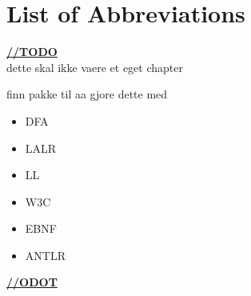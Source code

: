 \chapter{List of Abbreviations}


\underline{\textbf{\LARGE //TODO}}
\normalsize \\
dette skal ikke vaere et eget chapter

finn pakke til aa gjore dette med

\begin{itemize}
\item DFA
\item LALR
\item LL
\item W3C
\item EBNF
\item ANTLR
\end{itemize}


\underline{\textbf{\LARGE //ODOT}}